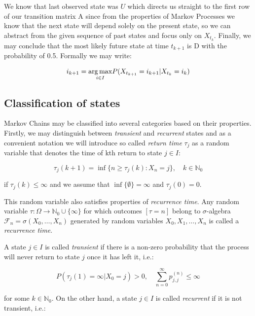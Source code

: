 We know that last observed state was $U$ which directs us straight to the first row of our transition matrix A since from the properties of Markov Processes we know that the next state will depend solely on the present state, 
so we can abstract from the given sequence of past states and focus only on $X_{t_{k}}$. Finally, we may conclude that the most likely future state at time $t_{k+1}$ is D with the probability of 0.5. Formally we may write:

\begin{equation}
 i_{k+1} = \underset{i \in I}{\arg\max} P(X_{t_{k+1}}=i_{k+1}|X_{t_{k}}=i_{k}) \\
\end{equation}

\subsection{Classification of states}

Markov Chains may be classified into several categories based on their properties. 
Firstly, we may distinguish between {\it transient} and {\it recurrent} states and as a convenient notation we will introduce so called {\it return time} $\tau_j$ 
as a random variable that denotes the time of kth return to state $j \in I$:

\begin{equation}
\tau_j(k+1) = \inf \{n \geq \tau_j(k) : X_n =j\}, \quad k \in \mathbb{N}_0
\end{equation}

if $\tau_j(k) \leq \infty$ and we assume that $\inf\{\emptyset\} = \infty$ and $\tau_j(0) = 0$.

This random variable also satisfies properties of {\it recurrence time}. 
Any random variable $\tau:\Omega \to \mathbb{N}_0 \cup \{ \infty \}$ for which outcomes $[\tau = n]$ belong to 
$\sigma$-algebra $\mathcal{F}_n = \sigma(X_0,\ldots,X_n)$ generated by random variables $X_0,X_1, \ldots , X_n$ is called a {\it recurrence time}.

A state $j \in I$ is called {\it transient} if there is a non-zero probability that the process will never return to state $j$ once it has left it, i.e.:

\begin{equation}
P(\tau_j(1) = \infty|X_0=j) > 0, \quad \sum_{n=0}^{\infty} p_{j,j}^{(n)} \leq \infty
\end{equation}

for some $k \in \mathbb{N}_0$. On the other hand, a state $j \in I$ is called {\it recurrent} if it is not transient, i.e.:

